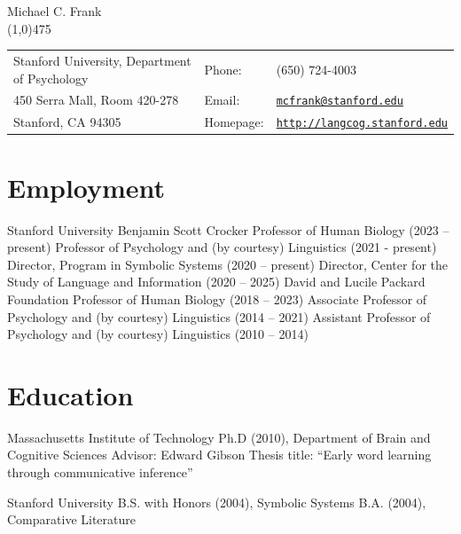 \documentclass{article}
\def\name{Michael C. Frank}
\renewenvironment{itemize}{
\begin{list}{}{
  \setlength{\leftmargin}{1.5em}
  }
  }{
\end{list}
}
\begin{document}
{\huge \name}\\
\line(1,0){475}

\vspace{0.15in}

\begin{tabular}{lll}
  Stanford University, Department of Psychology~~~ &   Phone: & (650) 724-4003 \\
  450 Serra Mall, Room 420-278  & Email: & \href{mailto:mcfrank@stanford.edu}{\tt mcfrank@stanford.edu} \\
  Stanford, CA 94305  & Homepage: & \href{http://langcog.stanford.edu}{\tt      http://langcog.stanford.edu}
\end{tabular}

\section*{Employment}

\begin{itemize}
  \item Stanford University
  \subitem Benjamin Scott Crocker Professor of Human Biology (2023 -- present)
  \subitem Professor of Psychology and (by courtesy) Linguistics (2021 - present)
   \subitem Director, Program in Symbolic Systems (2020 -- present)
   \subitem Director, Center for the Study of Language and Information (2020 -- 2025)
  \subitem David and Lucile Packard Foundation Professor of Human Biology (2018 -- 2023)
  \subitem Associate Professor of Psychology and (by courtesy) Linguistics (2014 -- 2021)
  \subitem Assistant Professor of Psychology and (by courtesy) Linguistics (2010 -- 2014)
\end{itemize}

\section*{Education}

\begin{itemize}
  \item Massachusetts Institute of Technology
  \subitem Ph.D (2010), Department of Brain and Cognitive Sciences
  \subsubitem Advisor: Edward Gibson
  \subsubitem Thesis title: ``Early word learning through communicative inference''
  \item Stanford University
  \subitem B.S. with Honors (2004), Symbolic Systems
  \subitem B.A. (2004), Comparative Literature
\end{itemize}
\end{document}
